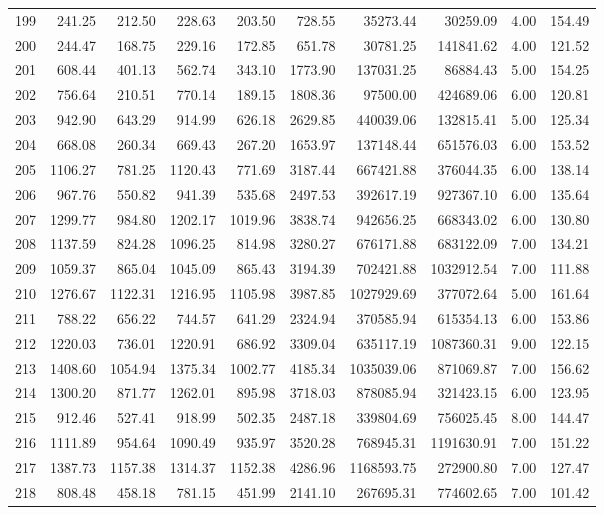 \begin{tabular}{lrrrrrrrrr}
199 & 241.25 & 212.50 & 228.63 & 203.50 & 728.55 & 35273.44 & 30259.09 & 4.00 & 154.49 \\
200 & 244.47 & 168.75 & 229.16 & 172.85 & 651.78 & 30781.25 & 141841.62 & 4.00 & 121.52 \\
201 & 608.44 & 401.13 & 562.74 & 343.10 & 1773.90 & 137031.25 & 86884.43 & 5.00 & 154.25 \\
202 & 756.64 & 210.51 & 770.14 & 189.15 & 1808.36 & 97500.00 & 424689.06 & 6.00 & 120.81 \\
203 & 942.90 & 643.29 & 914.99 & 626.18 & 2629.85 & 440039.06 & 132815.41 & 5.00 & 125.34 \\
204 & 668.08 & 260.34 & 669.43 & 267.20 & 1653.97 & 137148.44 & 651576.03 & 6.00 & 153.52 \\
205 & 1106.27 & 781.25 & 1120.43 & 771.69 & 3187.44 & 667421.88 & 376044.35 & 6.00 & 138.14 \\
206 & 967.76 & 550.82 & 941.39 & 535.68 & 2497.53 & 392617.19 & 927367.10 & 6.00 & 135.64 \\
207 & 1299.77 & 984.80 & 1202.17 & 1019.96 & 3838.74 & 942656.25 & 668343.02 & 6.00 & 130.80 \\
208 & 1137.59 & 824.28 & 1096.25 & 814.98 & 3280.27 & 676171.88 & 683122.09 & 7.00 & 134.21 \\
209 & 1059.37 & 865.04 & 1045.09 & 865.43 & 3194.39 & 702421.88 & 1032912.54 & 7.00 & 111.88 \\
210 & 1276.67 & 1122.31 & 1216.95 & 1105.98 & 3987.85 & 1027929.69 & 377072.64 & 5.00 & 161.64 \\
211 & 788.22 & 656.22 & 744.57 & 641.29 & 2324.94 & 370585.94 & 615354.13 & 6.00 & 153.86 \\
212 & 1220.03 & 736.01 & 1220.91 & 686.92 & 3309.04 & 635117.19 & 1087360.31 & 9.00 & 122.15 \\
213 & 1408.60 & 1054.94 & 1375.34 & 1002.77 & 4185.34 & 1035039.06 & 871069.87 & 7.00 & 156.62 \\
214 & 1300.20 & 871.77 & 1262.01 & 895.98 & 3718.03 & 878085.94 & 321423.15 & 6.00 & 123.95 \\
215 & 912.46 & 527.41 & 918.99 & 502.35 & 2487.18 & 339804.69 & 756025.45 & 8.00 & 144.47 \\
216 & 1111.89 & 954.64 & 1090.49 & 935.97 & 3520.28 & 768945.31 & 1191630.91 & 7.00 & 151.22 \\
217 & 1387.73 & 1157.38 & 1314.37 & 1152.38 & 4286.96 & 1168593.75 & 272900.80 & 7.00 & 127.47 \\
218 & 808.48 & 458.18 & 781.15 & 451.99 & 2141.10 & 267695.31 & 774602.65 & 7.00 & 101.42 \\

\end{tabular}
